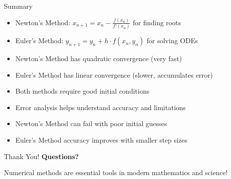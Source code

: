 \documentclass[aspectratio=169]{beamer}
\begin{document}
\begin{frame}{Summary}
\begin{itemize}
    \item Newton's Method: $x_{n+1} = x_n - \frac{f(x_n)}{f'(x_n)}$ for finding roots
    \item Euler's Method: $y_{n+1} = y_n + h \cdot f(x_n, y_n)$ for solving ODEs
    \item Newton's Method has quadratic convergence (very fast)
    \item Euler's Method has linear convergence (slower, accumulates error)
    \item Both methods require good initial conditions
    \item Error analysis helps understand accuracy and limitations
    \item Newton's Method can fail with poor initial guesses
    \item Euler's Method accuracy improves with smaller step sizes
\end{itemize}
\end{frame}

\begin{frame}{Thank You!}
\centering
\vspace{2cm}
{\Huge \textcolor{myblue}{\textbf{Questions?}}}

\vspace{1cm}
{\Large Numerical methods are essential tools in modern mathematics and science!}
\end{frame}
\end{document}
